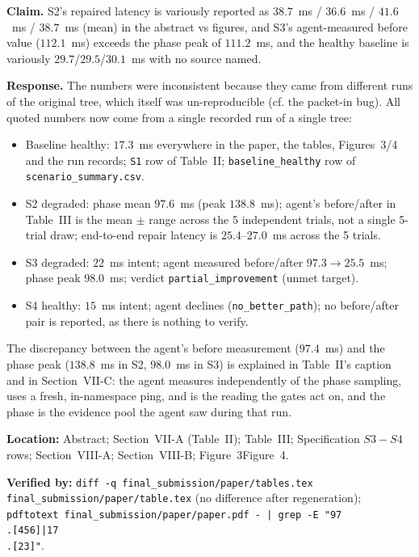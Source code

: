 \documentclass[11pt,a4paper]{article}
\begin{document}
\textbf{Claim.} S2's repaired latency is variously reported as
$38.7$~ms / $36.6$~ms / $41.6$~ms / $38.7$~ms (mean) in the abstract vs
figures, and S3's agent-measured before value ($112.1$~ms) exceeds the phase
peak of $111.2$~ms, and the healthy baseline is variously
$29.7$/$29.5$/$30.1$~ms with no source named.

\textbf{Response.} The numbers were inconsistent because they came from
different runs of the original tree, which itself was un-reproducible (cf.
the packet-in bug). All quoted numbers now come from a single recorded run
of a single tree:

\begin{itemize}
\item Baseline healthy: $17.3$~ms everywhere in the paper, the tables,
  Figures~3/4 and the run records; \texttt{S1} row of Table~II;
  \texttt{baseline\_healthy} row of \texttt{scenario\_summary.csv}.
\item S2 degraded: phase mean $97.6$~ms (peak $138.8$~ms); agent's
  before/after in Table~III is the mean $\pm$ range across the 5
  independent trials, not a single 5-trial draw; end-to-end repair latency is
  $25.4$--$27.0$~ms across the 5 trials.
\item S3 degraded: $22$~ms intent; agent measured before/after
  $97.3 \to 25.5$~ms; phase peak $98.0$~ms; verdict
  \texttt{partial\_improvement} (unmet target).
\item S4 healthy: $15$~ms intent; agent declines (\texttt{no\_better\_path});
  no before/after pair is reported, as there is nothing to verify.
\end{itemize}

The discrepancy between the agent's before measurement ($97.4$~ms) and the
phase peak ($138.8$~ms in S2, $98.0$~ms in S3) is explained in Table~II's
caption and in Section~VII-C: the agent measures independently of the phase
sampling, uses a fresh, in-namespace ping, and is the reading the gates act
on, and the phase is the evidence pool the agent saw during that run.

\textbf{Location:} Abstract; Section~VII-A (Table~II); Table~III;
Specification $S3\!-\!S4$ rows; Section~VIII-A; Section~VIII-B; Figure~3Figure~4.

\textbf{Verified by:}
\texttt{diff -q final\_submission/paper/tables.tex final\_submission/paper/table.tex}
(no difference after regeneration);
\texttt{pdftotext final\_submission/paper/paper.pdf - | grep -E "97\\.[456]|17\\.[23]"}.
\end{document}

